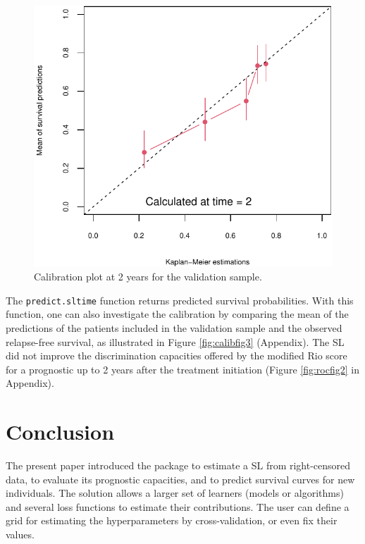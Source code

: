 \begin{figure}
\centering
\includegraphics{RJ-2024-037_files/figure-latex/calibfig2-1.pdf}
\caption{\label{fig:calibfig2}Calibration plot at 2 years for the validation sample.}
\end{figure}

The \texttt{predict.sltime} function returns predicted survival probabilities. With this function, one can also investigate the calibration by comparing the mean of the predictions of the patients included in the validation sample and the observed relapse-free survival, as illustrated in Figure \ref{fig:calibfig3} (Appendix). The SL did not improve the discrimination capacities offered by the modified Rio score for a prognostic up to 2 years after the treatment initiation (Figure \ref{fig:rocfig2} in Appendix).

\hypertarget{conclusion}{%
\section{Conclusion}\label{conclusion}}

The present paper introduced the  package to estimate a SL from right-censored data, to evaluate its prognostic capacities, and to predict survival curves for new individuals. The solution allows a larger set of learners (models or algorithms) and several loss functions to estimate their contributions. The user can define a grid for estimating the hyperparameters by cross-validation, or even fix their values.


